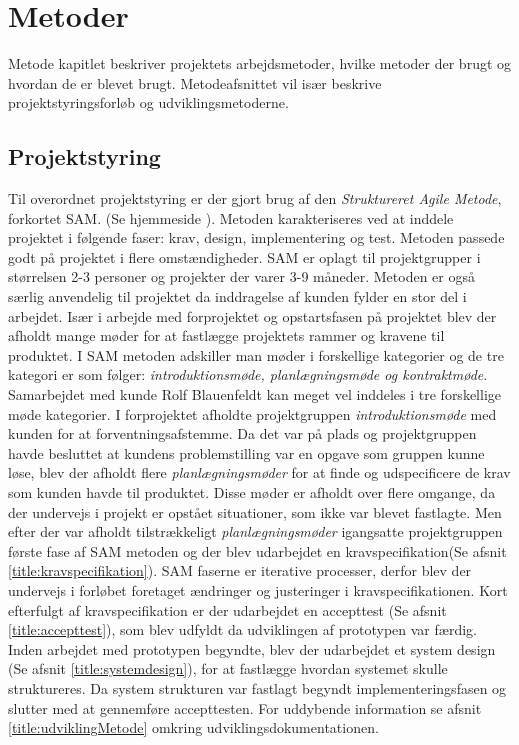 \chapter{Metoder}
Metode kapitlet beskriver projektets arbejdsmetoder, hvilke metoder der brugt og hvordan de er blevet brugt. Metodeafsnittet vil især beskrive projektstyringsforløb og udviklingsmetoderne. 

\section{Projektstyring} \label{title:projektstyring}
Til overordnet projektstyring er der gjort brug af den \textit{Struktureret Agile Metode}, forkortet SAM. (Se hjemmeside ). Metoden karakteriseres ved at inddele projektet i følgende faser: krav, design, implementering og test. Metoden passede godt på projektet i flere omstændigheder. SAM er oplagt til projektgrupper i størrelsen 2-3 personer og projekter der varer 3-9 måneder. Metoden er også særlig anvendelig til projektet da inddragelse af kunden fylder en stor del i arbejdet. 
Især i arbejde med forprojektet og opstartsfasen på projektet blev der afholdt mange møder for at fastlægge projektets rammer og kravene til produktet. I SAM metoden adskiller man møder i forskellige kategorier og de tre kategori er som følger: \textit{introduktionsmøde, planlægningsmøde og kontraktmøde}. Samarbejdet med kunde Rolf Blauenfeldt kan meget vel inddeles i tre forskellige møde kategorier. I forprojektet afholdte projektgruppen \textit{introduktionsmøde} med kunden for at forventningsafstemme. Da det var på plads og projektgruppen havde besluttet at kundens problemstilling var en opgave som gruppen kunne løse, blev der afholdt flere \textit{planlægningsmøder} for at finde og udspecificere de  krav som kunden havde til produktet. Disse møder er afholdt over flere omgange, da der undervejs i projekt er opstået situationer, som ikke var blevet fastlagte. Men efter der var afholdt tilstrækkeligt \textit{planlægningsmøder} igangsatte projektgruppen første fase af SAM metoden og der blev udarbejdet en kravspecifikation(Se afsnit \ref{title:kravspecifikation}). SAM faserne er iterative processer, derfor blev der undervejs i forløbet  foretaget ændringer og justeringer i kravspecifikationen. Kort efterfulgt af kravspecifikation er der udarbejdet en accepttest (Se afsnit \ref{title:accepttest}), som blev udfyldt da udviklingen af prototypen var færdig. Inden arbejdet med prototypen begyndte, blev der udarbejdet et system design (Se afsnit \ref{title:systemdesign}), for at fastlægge hvordan systemet skulle struktureres. Da system strukturen var fastlagt begyndt implementeringsfasen og slutter med at gennemføre accepttesten. For uddybende information se afsnit \ref{title:udviklingMetode} omkring udviklingsdokumentationen.

